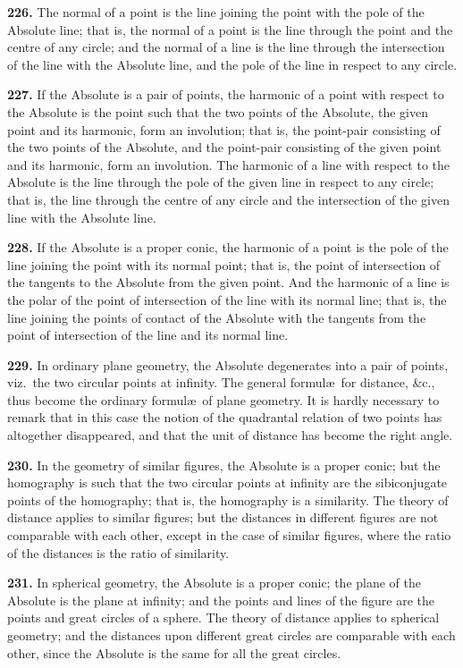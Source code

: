 \documentclass[11pt,a4paper]{article}
\begin{document}
\textbf{226.} The normal of a point is the line joining the point with the pole of the
Absolute line; that is, the normal of a point is the line through the point and the
centre of any circle; and the normal of a line is the line through the intersection of
the line with the Absolute line, and the pole of the line in respect to any circle.

\textbf{227.} If the Absolute is a pair of points, the harmonic of a point with respect to
the Absolute is the point such that the two points of the Absolute, the given point and
its harmonic, form an involution; that is, the point-pair consisting of the two points of
the Absolute, and the point-pair consisting of the given point and its harmonic, form
an involution. The harmonic of a line with respect to the Absolute is the line through
the pole of the given line in respect to any circle; that is, the line through the centre
of any circle and the intersection of the given line with the Absolute line.

\textbf{228.} If the Absolute is a proper conic, the harmonic of a point is the pole of
the line joining the point with its normal point; that is, the point of intersection of
the tangents to the Absolute from the given point. And the harmonic of a line is the
polar of the point of intersection of the line with its normal line; that is, the line
joining the points of contact of the Absolute with the tangents from the point of
intersection of the line and its normal line.

\textbf{229.} In ordinary plane geometry, the Absolute degenerates into a pair of points,
viz.\ the two circular points at infinity. The general formul\ae\ for distance, \&c.,
thus become the ordinary formul\ae\ of plane geometry. It is hardly necessary to
remark that in this case the notion of the quadrantal relation of two points has
altogether disappeared, and that the unit of distance has become the right angle.

\textbf{230.} In the geometry of similar figures, the Absolute is a proper conic; but the
homography is such that the two circular points at infinity are the sibiconjugate points
of the homography; that is, the homography is a similarity. The theory of distance
applies to similar figures; but the distances in different figures are not comparable with
each other, except in the case of similar figures, where the ratio of the distances is the
ratio of similarity.

\textbf{231.} In spherical geometry, the Absolute is a proper conic; the plane of the
Absolute is the plane at infinity; and the points and lines of the figure are the points
and great circles of a sphere. The theory of distance applies to spherical geometry;
and the distances upon different great circles are comparable with each other, since the
Absolute is the same for all the great circles.
\end{document}
